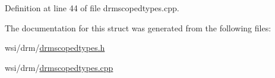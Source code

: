 Definition at line 44 of file drmscopedtypes.\+cpp.


\begin{DoxyCode}{0}
\end{DoxyCode}


The documentation for this struct was generated from the following files\+:\begin{DoxyCompactItemize}
\item 
wsi/drm/\mbox{\hyperlink{drmscopedtypes_8h}{drmscopedtypes.\+h}}\item 
wsi/drm/\mbox{\hyperlink{drmscopedtypes_8cpp}{drmscopedtypes.\+cpp}}\end{DoxyCompactItemize}
